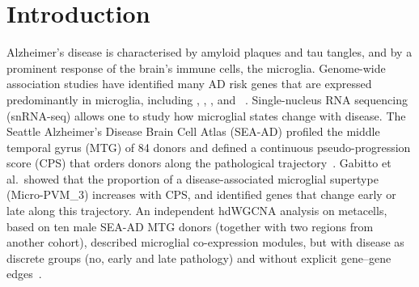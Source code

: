 \maketitle
\vspace{-0.8cm}

\begin{abstract}
\noindent
Microglia respond strongly to Alzheimer's disease (AD), but it remains unclear which microglial genes are \emph{directly} associated with pathology severity and which are linked only through other genes. We reconstructed gene networks for 48 microglial genes together with a continuous pathology score (CPS) and a sequencing-depth variable, using three network inference methods (ARACNE, PC and MIIC), on single-nucleus RNA-seq data from the middle temporal gyrus (MTG) of the SEA-AD cohort. We compared two data representations: metacells (sums of 30 nuclei) and single nuclei. The three methods agreed on \consMeta{} (metacells) and \consNuc{} (nuclei) edges, mostly known biology such as -- and --. MIIC linked CPS to 19 variables (18 genes and the depth variable) on metacells, but a control with CPS shuffled between donors produced the same $\sim$18 links, showing that they are a donor-level artefact. After this control, , a marker of the disease-associated microglia (DAM) state, was the only robust CPS neighbour across all three methods. Our results illustrate that metacell aggregation can create spurious links to donor-level variables, and that shuffling controls are essential for such analyses.
\end{abstract}

\section{Introduction}
Alzheimer's disease is characterised by amyloid plaques and tau tangles, and by a prominent response of the brain's immune cells, the microglia. Genome-wide association studies have identified many AD risk genes that are expressed predominantly in microglia, including , , ,  and ~\cite{Gabitto2024}. Single-nucleus RNA sequencing (snRNA-seq) allows one to study how microglial states change with disease. The Seattle Alzheimer's Disease Brain Cell Atlas (SEA-AD) profiled the middle temporal gyrus (MTG) of 84 donors and defined a continuous pseudo-progression score (CPS) that orders donors along the pathological trajectory~\cite{Gabitto2024,Hawrylycz2024}. Gabitto et al.\ showed that the proportion of a disease-associated microglial supertype (Micro-PVM\_3) increases with CPS, and identified genes that change early or late along this trajectory. An independent hdWGCNA analysis on metacells, based on ten male SEA-AD MTG donors (together with two regions from another cohort), described microglial co-expression modules, but with disease as discrete groups (no, early and late pathology) and without explicit gene--gene edges~\cite{Adeoye2025}.

